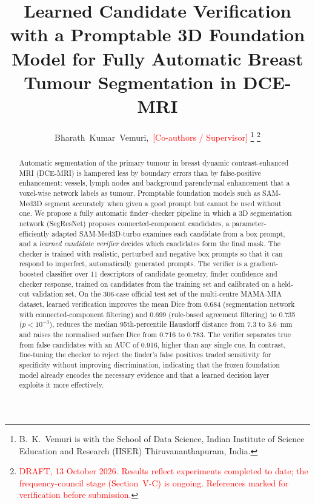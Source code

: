 \documentclass[journal]{IEEEtran}
\newcommand{\todo}[1]{\textcolor{red}{[#1]}}
\begin{document}
\title{Learned Candidate Verification with a Promptable 3D Foundation Model for Fully Automatic Breast Tumour Segmentation in DCE-MRI}

\author{Bharath~Kumar~Vemuri,~\todo{Co-authors / Supervisor}%
\thanks{B.~K.~Vemuri is with the School of Data Science, Indian Institute of Science Education and Research (IISER) Thiruvananthapuram, India.}%
\thanks{\textcolor{red}{DRAFT, 13 October 2026. Results reflect experiments completed to date; the frequency-council stage (Section~V-C) is ongoing. References marked for verification before submission.}}}


\maketitle

\begin{abstract}
Automatic segmentation of the primary tumour in breast dynamic contrast-enhanced MRI (DCE-MRI) is hampered less by boundary errors than by false-positive enhancement: vessels, lymph nodes and background parenchymal enhancement that a voxel-wise network labels as tumour. Promptable foundation models such as SAM-Med3D segment accurately when given a good prompt but cannot be used without one. We propose a fully automatic finder--checker pipeline in which a 3D segmentation network (SegResNet) proposes connected-component candidates, a parameter-efficiently adapted SAM-Med3D-turbo examines each candidate from a box prompt, and a \emph{learned candidate verifier} decides which candidates form the final mask. The checker is trained with realistic, perturbed and negative box prompts so that it can respond to imperfect, automatically generated prompts. The verifier is a gradient-boosted classifier over 11 descriptors of candidate geometry, finder confidence and checker response, trained on candidates from the training set and calibrated on a held-out validation set. On the 306-case official test set of the multi-centre MAMA-MIA dataset, learned verification improves the mean Dice from 0.684 (segmentation network with connected-component filtering) and 0.699 (rule-based agreement filtering) to 0.735 ($p<10^{-3}$), reduces the median 95th-percentile Hausdorff distance from 7.3 to 3.6~mm and raises the normalised surface Dice from 0.716 to 0.783. The verifier separates true from false candidates with an AUC of 0.916, higher than any single cue. In contrast, fine-tuning the checker to reject the finder's false positives traded sensitivity for specificity without improving discrimination, indicating that the frozen foundation model already encodes the necessary evidence and that a learned decision layer exploits it more effectively.
\end{abstract}
\end{document}
